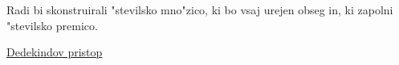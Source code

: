 Radi bi skonstruirali "stevilsko mno"zico, ki bo vsaj urejen obseg in, ki zapolni "stevilsko premico.

\underline{Dedekindov pristop}
